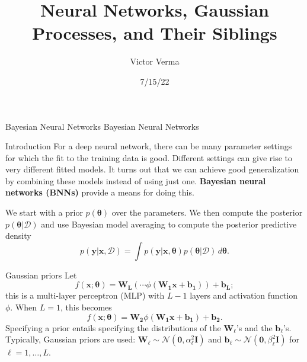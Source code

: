 \documentclass{beamer}
\title[NNs, GPs, and Their Siblings]{
Neural Networks, Gaussian Processes, and Their Siblings
}
\author[Victor Verma]{Victor Verma}
\institute[]{Hot Ideas in Machine Learning Reading Group, University of Michigan}
\date{7/15/22}
\begin{document}
\begin{frame}
  \titlepage
\end{frame}



\begin{frame}{Bayesian Neural Networks}
    Bayesian Neural Networks
\end{frame}

\begin{frame}{Introduction}
    For a deep neural network, there can be many parameter settings for which the fit to the training data is good. Different settings can give rise to very different fitted models. It turns out that we can achieve good generalization by combining these models instead of using just one. \textbf{Bayesian neural networks (BNNs)} provide a means for doing this.
    
    \medskip
    
    We start with a prior $p(\boldsymbol{\theta})$ over the parameters. We then compute the posterior $p(\boldsymbol{\theta} | \mathcal{D})$ and use Bayesian model averaging to compute the posterior predictive density
    \begin{equation*}
        p(\boldsymbol{y} | \boldsymbol{x}, \mathcal{D}) = \int p(\boldsymbol{y} | \boldsymbol{x}, \boldsymbol{\theta})p(\boldsymbol{\theta} | \mathcal{D})\,d\boldsymbol{\theta}.
    \end{equation*}
\end{frame}

\begin{frame}{Gaussian priors}
    Let
    \[
    f(\boldsymbol{x}; \boldsymbol{\theta}) = \boldsymbol{W_L}(\cdots\phi(\boldsymbol{W_1}\boldsymbol{x} + \boldsymbol{b_1})) + \boldsymbol{b_L};
    \]
    this is a multi-layer perceptron (MLP) with $L - 1$ layers and activation function $\phi$. When $L = 1$, this becomes
    \[
    f(\boldsymbol{x}; \boldsymbol{\theta}) = \boldsymbol{W_2}\phi(\boldsymbol{W_1}\boldsymbol{x} + \boldsymbol{b_1}) + \boldsymbol{b_2}.
    \]
    Specifying a prior entails specifying the distributions of the $\boldsymbol{W}_{\ell}$'s and the $\boldsymbol{b}_{\ell}$'s. Typically, Gaussian priors are used: $\boldsymbol{W}_{\ell} \sim \mathcal{N}(\boldsymbol{0}, \alpha_{\ell}^2\boldsymbol{I})$ and $\boldsymbol{b}_{\ell} \sim \mathcal{N}(\boldsymbol{0}, \beta_{\ell}^2\boldsymbol{I})$ for $\ell = 1, \ldots, L$.
\end{frame}
\end{document}
